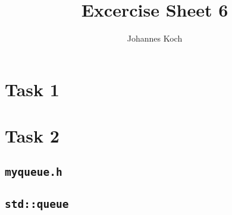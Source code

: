 \documentclass[11pt]{article} %
\title{Excercise Sheet 6}
\author{Johannes Koch}
\begin{document}
\maketitle

\section{Task 1}


\section{Task 2}
\subsection{\texttt{myqueue.h}}


\subsection{\texttt{std::queue}}

\end{document}
